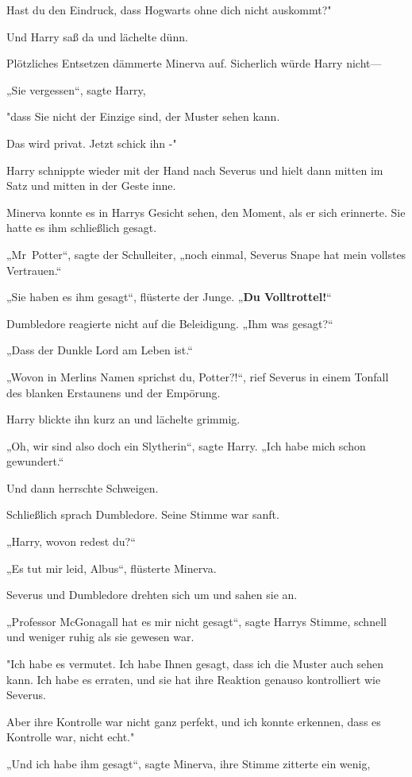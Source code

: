 {Hast du den Eindruck, dass Hogwarts ohne dich nicht auskommt?"

Und Harry saß da und lächelte dünn.

Plötzliches Entsetzen dämmerte Minerva auf. Sicherlich würde Harry nicht—

„Sie vergessen“, sagte Harry,

"dass Sie nicht der Einzige sind, der Muster sehen kann.

Das wird privat. Jetzt schick ihn -"

Harry schnippte wieder mit der Hand nach Severus und hielt dann mitten im Satz und mitten in der Geste inne.

Minerva konnte es in Harrys Gesicht sehen, den Moment, als er sich erinnerte. Sie hatte es ihm schließlich gesagt.

„Mr~Potter“, sagte der Schulleiter, „noch einmal, Severus Snape hat mein vollstes Vertrauen.“

„Sie haben es ihm gesagt“, flüsterte der Junge. „\textbf{Du Volltrottel!}“

Dumbledore reagierte nicht auf die Beleidigung. „Ihm was gesagt?“

„Dass der Dunkle Lord am Leben ist.“

„Wovon in Merlins Namen sprichst du, Potter?!“, rief Severus in einem Tonfall des blanken Erstaunens und der Empörung.

Harry blickte ihn kurz an und lächelte grimmig.

„Oh, wir sind also doch ein Slytherin“, sagte Harry. „Ich habe mich schon gewundert.“

Und dann herrschte Schweigen.

Schließlich sprach Dumbledore. Seine Stimme war sanft.

„Harry, wovon redest du?“

„Es tut mir leid, Albus“, flüsterte Minerva.

Severus und Dumbledore drehten sich um und sahen sie an.

„Professor McGonagall hat es mir nicht gesagt“, sagte Harrys Stimme, schnell und weniger ruhig als sie gewesen war.

"Ich habe es vermutet. Ich habe Ihnen gesagt, dass ich die Muster auch sehen kann. Ich habe es erraten, und sie hat ihre Reaktion genauso kontrolliert wie Severus.

Aber ihre Kontrolle war nicht ganz perfekt, und ich konnte erkennen, dass es Kontrolle war, nicht echt."

„Und ich habe ihm gesagt“, sagte Minerva, ihre Stimme zitterte ein wenig,

}
